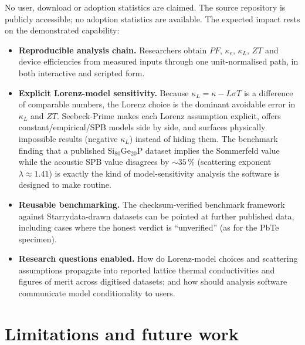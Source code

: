 \documentclass[preprint,12pt, a4paper]{elsarticle}
\begin{document}
No user, download or adoption statistics are claimed. The source repository is publicly accessible; no adoption statistics are available. The
expected impact rests on the demonstrated capability:

\begin{itemize}
  \item \textbf{Reproducible analysis chain.} Researchers obtain
        $PF$, $\kappa_{e}$, $\kappa_{L}$, $ZT$ and device efficiencies from
        measured inputs through one unit-normalised path, in both interactive
        and scripted form.
  \item \textbf{Explicit Lorenz-model sensitivity.} Because
        $\kappa_{L} = \kappa - L\sigma T$ is a difference of comparable
        numbers, the Lorenz choice is the dominant avoidable error in
        $\kappa_{L}$ and $ZT$. Seebeck-Prime makes each Lorenz assumption
        explicit, offers constant/empirical/SPB models side by side, and
        surfaces physically impossible results (negative $\kappa_{L}$) instead
        of hiding them. The benchmark finding that a published
        Si$_{80}$Ge$_{20}$P dataset implies the Sommerfeld value while the
        acoustic SPB value disagrees by $\sim 35\,\%$ (scattering exponent
        $\lambda \approx 1.41$) is exactly the kind of model-sensitivity
        analysis the software is designed to make routine.
  \item \textbf{Reusable benchmarking.} The checksum-verified benchmark
        framework against Starrydata-drawn datasets \cite{katsura2025} can be
        pointed at further published data, including cases where the honest
        verdict is ``unverified'' (as for the PbTe specimen).
  \item \textbf{Research questions enabled.} How do Lorenz-model choices and
        scattering assumptions propagate into reported lattice thermal
        conductivities and figures of merit across digitised datasets; and how
        should analysis software communicate model conditionality to users.
\end{itemize}


\section{Limitations and future work}
\label{sec:limitations}
\end{document}
